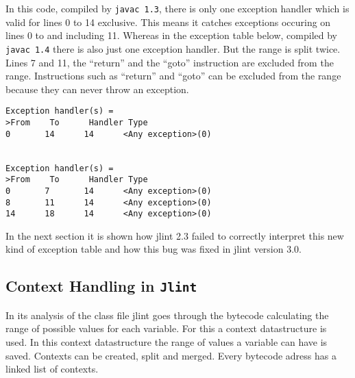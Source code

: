 \documentclass[11pt,twoside,a4paper,draft]{article}
\begin{document}
In this code, compiled by \texttt{javac 1.3}, there is only one exception handler
which is valid for lines 0 to 14 exclusive. This means it catches
exceptions occuring on lines 0 to and including 11. Whereas in the
exception table below, compiled by \texttt{javac 1.4} there is also
just one exception handler. But the range is split twice.
Lines 7 and 11, the ``return'' and the ``goto'' instruction
are excluded from the range. 
Instructions such as ``return'' and ``goto'' can be excluded from the range
because they can never throw an exception.


\begin{verbatim}
Exception handler(s) =
>From    To      Handler Type
0       14      14      <Any exception>(0)


Exception handler(s) =
>From    To      Handler Type
0       7       14      <Any exception>(0)
8       11      14      <Any exception>(0)
14      18      14      <Any exception>(0)

\end{verbatim}

In the next section it is shown how jlint 2.3 
failed to correctly interpret this new kind of exception table and how this
bug was fixed in jlint version 3.0. 


\subsection {Context Handling in \texttt{Jlint}}

In its analysis of the class file jlint goes through the bytecode calculating
the range of possible values for each variable. For this a context 
datastructure is used. In this context datastructure the range of 
values a variable  can have is saved. Contexts can be created, split and 
merged. Every bytecode adress has a linked list of contexts.
\end{document}
